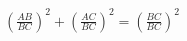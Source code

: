 \documentclass[preview]{standalone}
\begin{document}
\begin{align*}
\left(\frac{AB}{BC}\right)^2 + \left(\frac{AC}{BC}\right)^2 = \left(\frac{BC}{BC}\right)^2
\end{align*}
\end{document}

